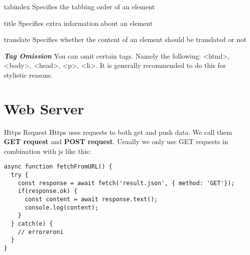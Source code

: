 \documentclass[main.tex,fontsize=6pt,paper=a4,paper=landscape,DIV=calc,]{scrartcl}
\begin{document}
\begin{multicols*}{4}
tabindex  Specifies the tabbing order of an element

title  Specifies extra information about an element

translate  Specifies whether the content of an element should be translated or not

\textbf{\emph{Tag Omission}}  You can omit certain tags. Namely the following: <html>, <body>, <head>, <p>, <li>.\newline
It is generally recommended to do this for stylistic reasons.







\section{Web Server}


Https Request  
Https uses requests to both get and push data.\newline
We call them \textbf{GET request} and \textbf{POST request}.\newline
Usually we only use GET requests in combination with js like this:\newline
\vspace{-2mm}
\begin{lstlisting}
async function fetchFromURL() {
  try {
    const response = await fetch('result.json', { method: 'GET'});
    if(response.ok) {
      const content = await response.text();
      console.log(content);
    }
  } catch(e) {
    // erroreroni
  }
}
\end{lstlisting}
\vspace{2mm}


\end{multicols*}
\end{document}
